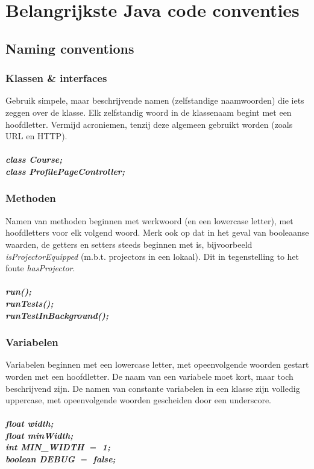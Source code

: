 \section{Belangrijkste Java code conventies}
\subsection{Naming conventions}
	\subsubsection{Klassen \& interfaces}
		Gebruik simpele, maar beschrijvende namen (zelfstandige naamwoorden) die iets zeggen over de klasse. Elk zelfstandig woord in de klassenaam begint met een hoofdletter. Vermijd acroniemen, tenzij deze algemeen gebruikt worden (zoals URL en HTTP).
		\\ \\
		\emph{\textbf{class Course;}} \\
		\emph{\textbf{class ProfilePageController;}}
		
	\subsubsection{Methoden}
		Namen van methoden beginnen met werkwoord (en een lowercase letter), met hoofdletters voor elk volgend woord.
		Merk ook op dat in het geval van booleaanse waarden, de getters en setters steeds beginnen met is, bijvoorbeeld \emph{isProjectorEquipped} (m.b.t. projectors in een lokaal). 
		Dit in tegenstelling to het foute \emph{hasProjector}.
		\\ \\
		\emph{\textbf{run();}} \\
		\emph{\textbf{runTests();}} \\
		\emph{\textbf{runTestInBackground();}}
		
	\subsubsection{Variabelen}
		Variabelen beginnen met een lowercase letter, met opeenvolgende woorden gestart worden met een hoofdletter. 
		De naam van een variabele moet kort, maar toch beschrijvend zijn. 
		De namen van constante variabelen in een klasse zijn volledig uppercase, met opeenvolgende woorden gescheiden door een underscore.
		\\ \\		
		\emph{\textbf{float width;}} \\
		\emph{\textbf{float minWidth;}} \\
		\emph{\textbf{int MIN\_WIDTH $=$ 1;}} \\
		\emph{\textbf{boolean DEBUG $=$ false;}} \\
		
